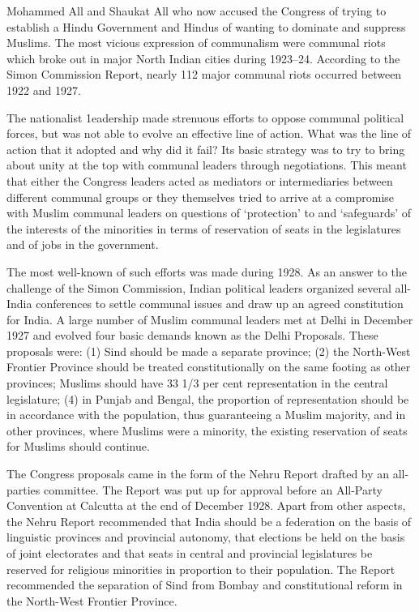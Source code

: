 Mohammed All and Shaukat All who now accused the Congress of trying to establish a Hindu Government and Hindus of wanting to dominate and suppress Muslims. The most vicious expression of communalism were communal riots which broke out in major North Indian cities during 1923--24. According to the Simon Commission Report, nearly 112 major communal riots occurred between 1922 and 1927. 

The nationalist 1eadership made strenuous efforts to oppose communal political forces, but was not able to evolve an effective line of action. What was the line of action that it adopted and why did it fail? Its basic strategy was to try to bring about unity at the top with communal leaders through negotiations. This meant that either the Congress leaders acted as mediators or intermediaries between different communal groups or they themselves tried to arrive at a compromise with Muslim communal leaders on questions of `protection' to and `safeguards' of the interests of the minorities in terms of reservation of seats in the legislatures and of jobs in the government. 

The most well-known of such efforts was made during 1928. As an answer to the challenge of the Simon Commission, Indian political leaders organized several all-India conferences to settle communal issues and draw up an agreed constitution for India. A large number of Muslim communal leaders met at Delhi in December 1927 and evolved four basic demands known as the Delhi Proposals. These proposals were: (1) Sind should be made a separate province; (2) the North-West Frontier Province should be treated constitutionally on the same footing as other provinces; Muslims should have 33 1/3 per cent representation in the central legislature; (4) in Punjab and Bengal, the proportion of representation should be in accordance with the population, thus guaranteeing a Muslim majority, and in other provinces, where Muslims were a minority, the existing reservation of seats for Muslims should continue. 

The Congress proposals came in the form of the Nehru Report drafted by an all-parties committee. The Report was put up for approval before an All-Party Convention at Calcutta at the end of December 1928. Apart from other aspects, the Nehru Report recommended that India should be a federation on the basis of linguistic provinces and provincial autonomy, that elections be held on the basis of joint electorates and that seats in central and provincial legislatures be reserved for religious minorities in proportion to their population. The Report recommended the separation of Sind from Bombay and constitutional reform in the North-West Frontier Province. 

